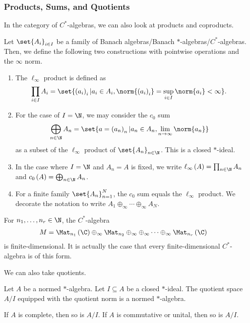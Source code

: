 \documentclass[10pt]{mypackage}
\begin{document}
\subsubsection{Products, Sums, and Quotients}%
In the category of $C^{\ast}$-algebras, we can also look at products and coproducts.
\begin{definition}
  Let $\set{A_i}_{i\in I}$ be a family of Banach algebras/Banach $\ast$-algebras/$C^{\ast}$-algebras. Then, we define the following two constructions with pointwise operations and the $\infty$ norm.
  \begin{enumerate}[(1)]
    \item The $\ell_{\infty}$ product is defined as
      \begin{align*}
        \prod_{i\in I}A_i &= \set{\left(a_i\right)_i | a_i\in A_i,\norm{\left(a_i\right)_i} = \sup_{i\in I}\norm{a_i} < \infty}.
      \end{align*}
    \item For the case of $I = \N$, we may consider the $c_0$ sum
      \begin{align*}
        \bigoplus_{n\in \N}A_n &= \set{a = \left(a_n\right)_n | a_n\in A_n,\lim_{n\rightarrow\infty}\norm{a_n}}
      \end{align*}
      as a subset of the $\ell_{\infty}$ product of $\set{A_n}_{n\in \N}$. This is a closed $\ast$-ideal.
    \item In the case where $I = \N$ and $A_n = A$ is fixed, we write $\ell_{\infty}\left(A\right) = \prod_{n\in\N} A_n$ and $c_0\left(A\right) = \bigoplus_{n\in\N}A_n$.
    \item For a finite family $\set{A_n}_{n=1}^{N}$, the $c_0$ sum equals the $\ell_{\infty}$ product. We decorate the notation to write $A_1 \oplus_{\infty}\cdots\oplus_{\infty}A_N$.
  \end{enumerate}
\end{definition}
\begin{example}
  For $n_1,\dots,n_r\in \N$, the $C^{\ast}$-algebra
  \begin{align*}
    M &= \Mat_{n_1}\left(\C\right) \oplus_{\infty}\Mat_{n_2}\oplus_{\infty}\oplus_{\infty}\cdots\oplus_{\infty}\Mat_{n_r}\left(\C\right)
  \end{align*}
  is finite-dimensional. It is actually the case that every finite-dimensional $C^{\ast}$-algebra is of this form.
\end{example}
We can also take quotients.
\begin{proposition}
  Let $A$ be a normed $\ast$-algebra. Let $I\subseteq A$ be a closed $\ast$-ideal. The quotient space $A/I$ equipped with the quotient norm is a normed $\ast$-algebra.\newline

  If $A$ is complete, then so is $A/I$. If $A$ is commutative or unital, then so is $A/I$.
\end{proposition}
\end{document}
